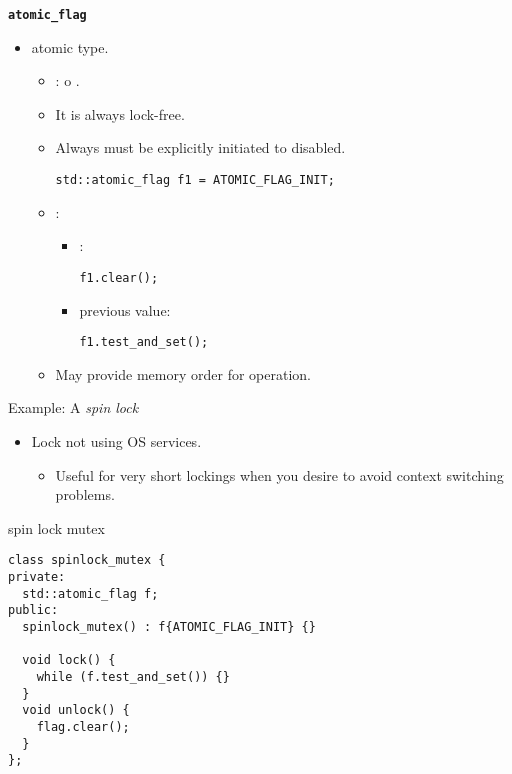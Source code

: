 \begin{frame}[t,fragile]{\texttt{\textbf{atomic\_flag}}}
\begin{itemize}
  \item {} atomic type.
    \begin{itemize}
      \item {}:  o .
      \item It is always lock-free.

      \item Always must be explicitly initiated to disabled.
\begin{lstlisting}
std::atomic_flag f1 = ATOMIC_FLAG_INIT;
\end{lstlisting}

      \item {}:
        \begin{itemize}
          \item {}: 
\begin{lstlisting}
f1.clear();
\end{lstlisting}
          \item {} previous value: 
\begin{lstlisting}
f1.test_and_set();
\end{lstlisting}
        \end{itemize}
      \item May provide memory order for operation.
    \end{itemize}
\end{itemize}
\end{frame}

\begin{frame}[t,fragile]{Example: A \emph{spin lock}}
\begin{itemize}
  \item Lock not using OS services.
    \begin{itemize}
      \item Useful for very short lockings when you desire to avoid context switching problems.
    \end{itemize}
\end{itemize}
\begin{block}{spin lock mutex}
\begin{lstlisting}
class spinlock_mutex {
private:
  std::atomic_flag f;
public:
  spinlock_mutex() : f{ATOMIC_FLAG_INIT} {}

  void lock() {
    while (f.test_and_set()) {}
  }
  void unlock() {
    flag.clear();
  }
};
\end{lstlisting}
\end{block}
\end{frame}

